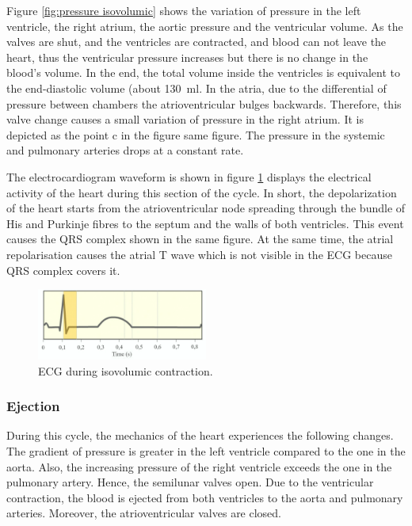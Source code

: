 Figure \ref{fig:pressure isovolumic} shows the variation of pressure in the left ventricle, the right atrium, the aortic pressure and the ventricular volume. As the valves are shut, and the ventricles are contracted, and blood can not leave the heart, thus the ventricular pressure increases but there is no change in the blood's volume. In the end, the total volume inside the ventricles is equivalent to the end-diastolic volume (about \SI{130}{\milli\litre}. In the atria, due to the differential of pressure between chambers the atrioventricular bulges backwards. Therefore, this valve change causes a small variation of pressure in the right atrium. It is depicted as the point c in the figure same figure. The pressure in the systemic and pulmonary arteries drops at a constant rate. 



The electrocardiogram waveform is shown in figure \ref{fig:ECG isovolumic} displays the electrical activity of the heart during this section of the cycle. In short, the depolarization of the heart starts from the atrioventricular node spreading through the bundle of His and Purkinje fibres to the septum and the walls of both ventricles. This event causes the QRS complex shown in the same figure. At the same time, the atrial repolarisation causes the atrial T wave which is not visible in the ECG because QRS complex covers it.

\begin{figure}[!htpb]
	\centering
	\includegraphics[width=0.5\textwidth,keepaspectratio]{figure_5}    
	\caption[Isovolumic contraction - ECG]{ECG during isovolumic contraction.}
	\label{fig:ECG isovolumic}
\end{figure}


\subsubsection{Ejection}
During this cycle, the mechanics of the heart experiences the following changes. The gradient of pressure is greater in the left ventricle compared to the one in the aorta. Also, the increasing pressure of the right ventricle exceeds the one in the pulmonary artery. Hence, the semilunar valves open. Due to the ventricular contraction, the blood is ejected from both ventricles to the aorta and pulmonary arteries. Moreover, the atrioventricular valves are closed.


